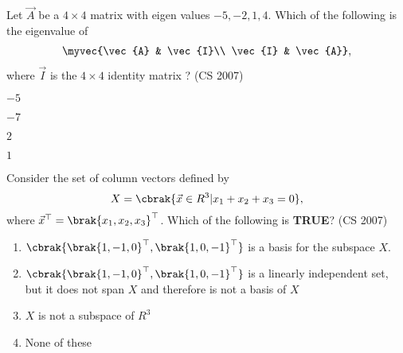 \item Let $\vec{A}$ be a $4 \times 4$ matrix with eigen values $-5,-2,1,4 $. Which of the following is the eigenvalue of
\begin{align*}
    \myvec{\vec{A} & \vec{I}\\ \vec{I} & \vec{A}},
\end{align*} 
where $\vec{I}$ is the $4 \times 4$ identity matrix ?
    \hfill (CS 2007)
\begin{enumerate}
	\begin{multicols}{4}
    \item $-5$
    \item $-7$
    \item $2$
    \item $1$
    \end{multicols}
\end{enumerate}
\item Consider the set of column vectors defined  by  $$X=\cbrak{\vec{x} \in R^3| x_1 +x_2+x_3 = 0},$$
	where $\vec{x}^{\top}={\brak{x_1,x_2,x_3}}^{\top}$. Which of the following is \textbf{TRUE}?
    \hfill (CS 2007)
    \begin{enumerate}
        \item $ \cbrak{{\brak{1,-1,0}}^{\top},{\brak{1,0,-1}}^{\top} } $ is a basis for the subspace $X$.
        \newline
        \item $ \cbrak{{\brak{1,-1,0}}^{\top},{\brak{1,0,-1}}^{\top} } $ is a linearly independent set, but it does not span $X$ and therefore is not a basis  of $X$
        \item $X$ is not a subspace of $R^3$
        \item None of these
    \end{enumerate}
